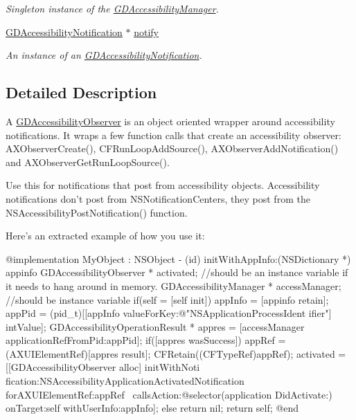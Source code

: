 \begin{DoxyCompactItemize}
\begin{DoxyCompactList}\small\item\em Singleton instance of the \hyperlink{interface_g_d_accessibility_manager}{GDAccessibilityManager}. \item\end{DoxyCompactList}\item 
\hypertarget{interface_g_d_accessibility_observer_ac10d3d1ce12d457cf53ac6bb3d86c380}{
\hyperlink{interface_g_d_accessibility_notification}{GDAccessibilityNotification} $\ast$ \hyperlink{interface_g_d_accessibility_observer_ac10d3d1ce12d457cf53ac6bb3d86c380}{notify}}
\label{interface_g_d_accessibility_observer_ac10d3d1ce12d457cf53ac6bb3d86c380}

\begin{DoxyCompactList}\small\item\em An instance of an \hyperlink{interface_g_d_accessibility_notification}{GDAccessibilityNotification}. \item\end{DoxyCompactList}\end{DoxyCompactItemize}


\subsection{Detailed Description}
A \hyperlink{interface_g_d_accessibility_observer}{GDAccessibilityObserver} is an object oriented wrapper around accessibility notifications. It wraps a few function calls that create an accessibility observer: AXObserverCreate(), CFRunLoopAddSource(), AXObserverAddNotification() and AXObserverGetRunLoopSource().

Use this for notifications that post from accessibility objects. Accessibility notifications don't post from NSNotificationCenters, they post from the NSAccessibilityPostNotification() function.

Here's an extracted example of how you use it: 
\begin{DoxyCode}
 @implementation MyObject : NSObject
 - (id) initWithAppInfo:(NSDictionary *) appinfo {
        GDAccessibilityObserver * activated; //should be an instance variable if 
      it needs to hang around in memory.
        GDAccessibilityManager * accessManager; //should be instance variable
        if(self = [self init]) {
                appInfo = [appinfo retain];
                appPid = (pid_t)[[appInfo valueForKey:@"NSApplicationProcessIdent
      ifier"] intValue];
                GDAccessibilityOperationResult * appres = [accessManager 
      applicationRefFromPid:appPid];
                if([appres wasSuccess]) {
                        appRef = (AXUIElementRef)[appres result];
                        CFRetain((CFTypeRef)appRef);
                        activated = [[GDAccessibilityObserver alloc] initWithNoti
      fication:NSAccessibilityApplicationActivatedNotification forAXUIElementRef:appRef
       \
                                                callsAction:@selector(application
      DidActivate:) onTarget:self withUserInfo:appInfo];
                } else {
                        return nil;
                }
        }
        return self;
 }
 @end
\end{DoxyCode}


